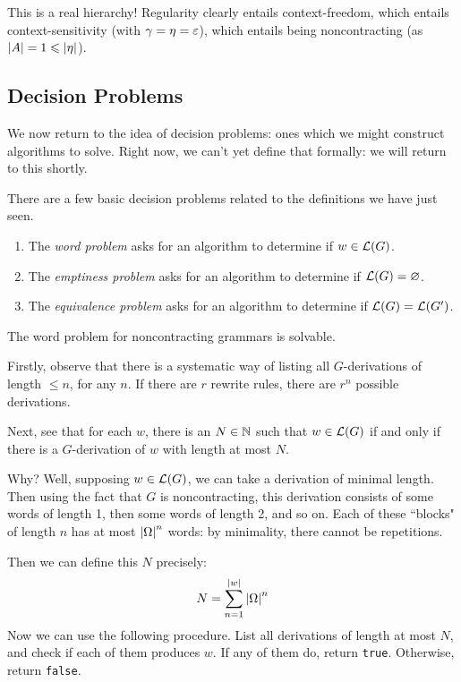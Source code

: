 \documentclass{article}
\begin{document}
\begin{note}
	This is a real hierarchy! Regularity clearly entails context-freedom, which entails context-sensitivity (with $\gamma = \eta = \varepsilon$), which entails being noncontracting (as $\left\lvert A \right\rvert = 1 \leqslant \left\lvert \eta \right\rvert$).
\end{note}

\subsection{Decision Problems}

We now return to the idea of decision problems: ones which we might construct algorithms to solve. Right now, we can't yet define that formally: we will return to this shortly.

There are a few basic decision problems related to the definitions we have just seen.

\begin{enumerate}
	\item The \textit{word problem} asks for an algorithm to determine if $w \in \mathcal{L} (G)$.
	\item The \textit{emptiness problem} asks for an algorithm to determine if $\mathcal{L} (G) = \varnothing$.
	\item The \textit{equivalence problem} asks for an algorithm to determine if $\mathcal{L} (G) = \mathcal{L} (G')$.
\end{enumerate}

\begin{theorem}
	\label{word-problem-noncontracting-solvable}
	The word problem for noncontracting grammars is solvable.
\end{theorem}

\begin{prf}
	Firstly, observe that there is a systematic way of listing all $G$-derivations of length $\leq n$, for any $n$. If there are $r$ rewrite rules, there are $r^n$ possible derivations.
	    
	Next, see that for each $w$, there is an $N \in \mathbb{N}$ such that $w \in \mathcal{L} (G)$ if and only if there is a $G$-derivation of $w$ with length at most $N$. 
	    
	Why? Well, supposing $w \in \mathcal{L} (G)$, we can take a derivation of minimal length. Then using the fact that $G$ is noncontracting, this derivation consists of some words of length 1, then some words of length 2, and so on. Each of these ``blocks" of length $n$ has at most $\left\lvert \Omega \right\rvert^n$ words: by minimality, there cannot be repetitions.
	    
	Then we can define this $N$ precisely:
	\[
		N = \sum_{n=1}^{\left\lvert w \right\rvert} \left\lvert \Omega \right\rvert^n
	\]
	Now we can use the following procedure. List all derivations of length at most $N$, and check if each of them produces $w$. If any of them do, return \texttt{true}. Otherwise, return \texttt{false}.
\end{prf}
\end{document}
